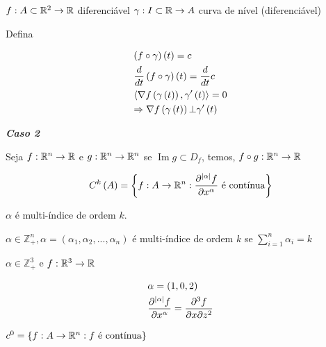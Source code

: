 \documentclass{book}
\begin{document}
$f:A \subset \mathbb{R}^2  \to \mathbb{R}$ diferenci\'avel
$\gamma :I \subset \mathbb{R} \to A$ curva de n\'ivel (diferenci\'avel)

Defina

\[
\begin{gathered}
\left( {f \circ \gamma } \right)\left( t \right) = c \hfill \\
\frac{d}
{{dt}}\left( {f \circ \gamma } \right)\left( t \right) = \frac{d}
{{dt}}c \hfill \\
  \left\langle {\nabla f\left( {\gamma \left( t \right)} \right),\gamma '\left( t \right)} \right\rangle  = 0 \hfill \\
   \Rightarrow \nabla f\left( {\gamma \left( t \right)} \right) \bot \gamma '\left( t \right) \hfill \\
\end{gathered}
\]


\textit{\textbf{Caso 2}}

Seja $f: \mathbb{R}^n \to \mathbb{R}$ e $g: \mathbb{R}^n \to \mathbb{R}^n$ se $\operatorname{Im} g \subset D_f$, temos, $f \circ g:\mathbb{R}^n  \to \mathbb{R}$

\[
C^k \left( A \right) = \left\{ {f:A \to \mathbb{R}^n :\frac{{\partial ^{\left| \alpha  \right|} f}}
{{\partial x^\alpha  }}{\text{ \'e cont\'inua}}} \right\}
\]

$\alpha$ \'e multi-\'indice de ordem $k$.

$\alpha  \in \mathbb{Z}_ + ^n ,\alpha  = \left( {\alpha _1 ,\alpha _2 ,...,\alpha _n } \right)$ \'e multi-\'indice de ordem $k$ se $\sum\limits_{i = 1}^n {\alpha _i }  = k$

\begin{ex}
$\alpha  \in \mathbb{Z}_ + ^3$ e $f:\mathbb{R}^3 \to \mathbb{R}$

\[
\begin{gathered}
\alpha  = \left( {1,0,2} \right) \hfill \\
\frac{{\partial ^{\left| \alpha  \right|} f}}
{{\partial x^\alpha  }} = \frac{{\partial ^3 f}}
{{\partial x\partial z^2 }} \hfill \\
\end{gathered}
\]

\end{ex}

\begin{ex}
$c^0  = \left\{ {f:A \to \mathbb{R}^n :f{\text{ \'e  cont\'inua}}} \right\}$

\end{ex}
\end{document}
